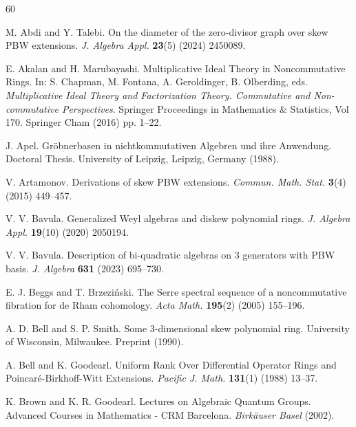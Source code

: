 \documentclass{amsart}
\theoremstyle{definition}
\theoremstyle{remark}
\numberwithin{equation}{section}
\begin{document}
\begin{thebibliography}{60}

 M. Abdi and Y. Talebi. On the diameter of the zero-divisor graph over skew PBW extensions. {\em J. Algebra Appl.} {\bf 23}(5) (2024) 2450089.

 E. Akalan and H. Marubayashi. Multiplicative Ideal Theory in Noncommutative Rings. In: S. Chapman, M. Fontana, A.  Geroldinger, B. Olberding, eds. {\em Multiplicative Ideal Theory and Factorization Theory. Commutative and Non-commutative Perspectives}. Springer Proceedings in Mathematics \& Statistics, Vol 170. Springer Cham (2016) pp. 1--22.


 J. Apel. Gr\"obnerbasen in nichtkommutativen Algebren und ihre Anwendung. Doctoral Thesis. University of Leipzig, Leipzig, Germany (1988).

 V. Artamonov. Derivations of skew PBW extensions. {\em Commun. Math. Stat.} {\bf 3}(4) (2015) 449--457.


 V. V. Bavula. Generalized Weyl algebras and diskew polynomial rings. {\em J. Algebra Appl.} {\bf 19}(10) (2020) 2050194.

 V. V. Bavula. Description of bi-quadratic algebras on 3 generators with {P}{B}{W} basis. {\em J. Algebra} {\bf 631} (2023) 695--730.

 E. J. Beggs and T. Brzezi{\'n}ski. The Serre spectral sequence of a noncommutative fibration for de Rham cohomology. {\em Acta Math.} {\bf 195}(2) (2005) 155--196.

 A. D. Bell and S. P. Smith. Some 3-dimensional skew polynomial ring. University of Wisconsin, Milwaukee. Preprint (1990).

 A. Bell and K. Goodearl. Uniform Rank Over Differential Operator Rings and Poincar{\'e}-Birkhoff-Witt Extensions. {\em Pacific J. Math.} {\bf 131}(1) (1988) 13--37.

 K. Brown and K. R. Goodearl. Lectures on {A}lgebraic {Q}uantum {G}roups. Advanced Courses in Mathematics - CRM Barcelona. {\em Birk\"auser Basel} (2002).


\end{thebibliography}
\end{document}
